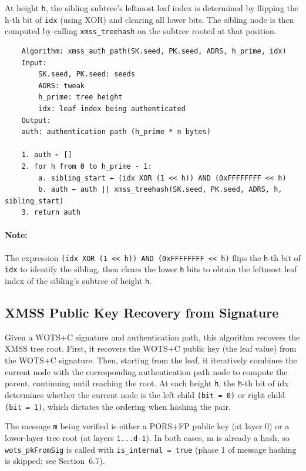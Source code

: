 At height \texttt{h}, the sibling subtree's leftmost leaf index is determined by flipping the h-th bit of \texttt{idx} (using XOR) and clearing all lower bits. The sibling node is then computed by calling \texttt{xmss\_treehash} on the subtree rooted at that position.
\begin{verbatim}
    Algorithm: xmss_auth_path(SK.seed, PK.seed, ADRS, h_prime, idx)
    Input:
        SK.seed, PK.seed: seeds
        ADRS: tweak
        h_prime: tree height
        idx: leaf index being authenticated
    Output:
    auth: authentication path (h_prime * n bytes)

    1. auth ← []
    2. for h from 0 to h_prime - 1:
        a. sibling_start ← (idx XOR (1 << h)) AND (0xFFFFFFFF << h)
        b. auth ← auth || xmss_treehash(SK.seed, PK.seed, ADRS, h, sibling_start)
    3. return auth
\end{verbatim}
\paragraph{Note:} The expression \texttt{(idx XOR (1 << h)) AND (0xFFFFFFFF << h)} flips the \texttt{h}-th bit of \texttt{idx} to identify the sibling, then clears the lower \texttt{h} bits to obtain the leftmost leaf index of the sibling's subtree of height \texttt{h}.

\subsection{XMSS Public Key Recovery from Signature}
Given a WOTS+C signature and authentication path, this algorithm recovers the XMSS tree root. First, it recovers the WOTS+C public key (the leaf value) from the WOTS+C signature. Then, starting from the leaf, it iteratively combines the current node with the corresponding authentication path node to compute the parent, continuing until reaching the root. At each height \texttt{h}, the \texttt{h}-th bit of idx determines whether the current node is the left child \texttt{(bit = 0)} or right child \texttt{(bit = 1)}, which dictates the ordering when hashing the pair.

The message \texttt{m} being verified is either a PORS+FP public key (at layer 0) or a lower-layer tree root (at layers \texttt{1...d-1}). In both cases, m is already a hash, so \texttt{wots\_pkFromSig} is called with \texttt{is\_internal = true} (phase 1 of message hashing is skipped; see Section~6.7).


